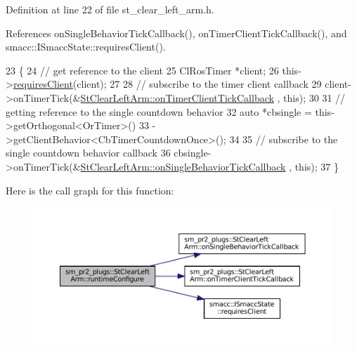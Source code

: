 Definition at line 22 of file st\+\_\+clear\+\_\+left\+\_\+arm.\+h.



References on\+Single\+Behavior\+Tick\+Callback(), on\+Timer\+Client\+Tick\+Callback(), and smacc\+::\+I\+Smacc\+State\+::requires\+Client().


\begin{DoxyCode}
23     \{
24         \textcolor{comment}{// get reference to the client}
25         ClRosTimer *client;
26         this->\hyperlink{classsmacc_1_1ISmaccState_a7f95c9f0a6ea2d6f18d1aec0519de4ac}{requiresClient}(client);
27 
28         \textcolor{comment}{// subscribe to the timer client callback}
29         client->onTimerTick(&\hyperlink{structsm__pr2__plugs_1_1StClearLeftArm_acd6c1a301f1b9c7229d42df9fb871a58}{StClearLeftArm::onTimerClientTickCallback}
      , \textcolor{keyword}{this});
30 
31         \textcolor{comment}{// getting reference to the single countdown behavior}
32         \textcolor{keyword}{auto} *cbsingle = this->getOrthogonal<OrTimer>()
33                              ->getClientBehavior<CbTimerCountdownOnce>();
34 
35         \textcolor{comment}{// subscribe to the single countdown behavior callback}
36         cbsingle->onTimerTick(&\hyperlink{structsm__pr2__plugs_1_1StClearLeftArm_a948758fe2f92ba1711b142ddd78f03ab}{StClearLeftArm::onSingleBehaviorTickCallback}
      , \textcolor{keyword}{this});
37     \}
\end{DoxyCode}
Here is the call graph for this function\+:
\nopagebreak
\begin{figure}[H]
\begin{center}
\leavevmode
\includegraphics[width=350pt]{structsm__pr2__plugs_1_1StClearLeftArm_a23696f6137f6e29e5144bafea171faaa_cgraph}
\end{center}
\end{figure}
\mbox{\label{structsm__pr2__plugs_1_1StClearLeftArm_a46e6f93715d9c6857c1222616d23c598}} 
